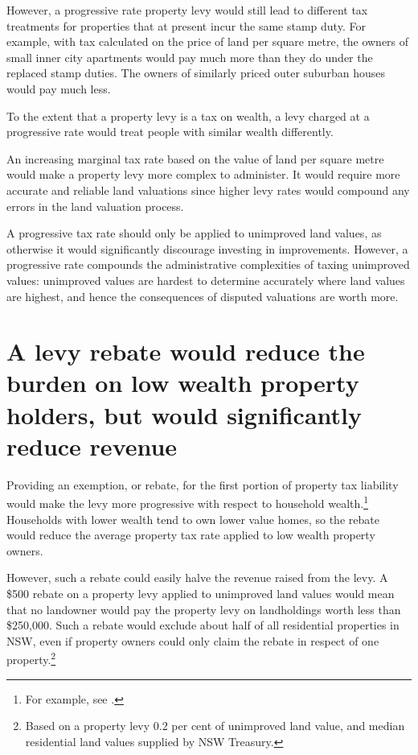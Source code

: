 \documentclass[twoside,english]{grattanBudgetRepairb5portrait}
\begin{document}
However, a progressive rate property levy would still lead to different tax treatments for properties that at present incur the same stamp duty. For example, with tax calculated on the price of land per square metre, the owners of small inner city apartments would pay much more than they do under the replaced stamp duties. The owners of similarly priced outer suburban houses would pay much less. 

To the extent that a property levy is a tax on wealth, a levy charged at a progressive rate would treat people with similar wealth differently. 

An increasing marginal tax rate based on the value of land per square metre would make a property levy more complex to administer. It would require more accurate and reliable land valuations since higher levy rates would compound any errors in the land valuation process. 

A progressive tax rate should only be applied to unimproved land values, as otherwise it would significantly discourage investing in improvements. However, a progressive rate compounds the administrative complexities of taxing unimproved values: unimproved values are hardest to determine accurately where land values are highest, and hence the consequences of disputed valuations are worth more.

\section{\label{sec:PROP-6-2}A levy rebate would reduce the burden on low wealth property holders, but would significantly reduce revenue}
Providing an exemption, or rebate, for the first portion of property tax liability would make the levy more progressive with respect to household wealth.\footnote{For example, see \textcite[][8]{SlackBird2014}.}  Households with lower wealth tend to own lower value homes, so the rebate would reduce the average property tax rate applied to low wealth property owners.  \enlargethispage{0.5\baselineskip}

However, such a rebate could easily halve the revenue raised from the levy. A \$500 rebate on a property levy applied to unimproved land values would mean that no landowner would pay the property levy on landholdings worth less than \$250,000. Such a rebate would exclude about half of all residential properties in NSW, even if property owners could only claim the rebate in respect of one property.\footnote{Based on a property levy 0.2 per cent of unimproved land value, and median residential land values supplied by NSW Treasury.}
\end{document}

